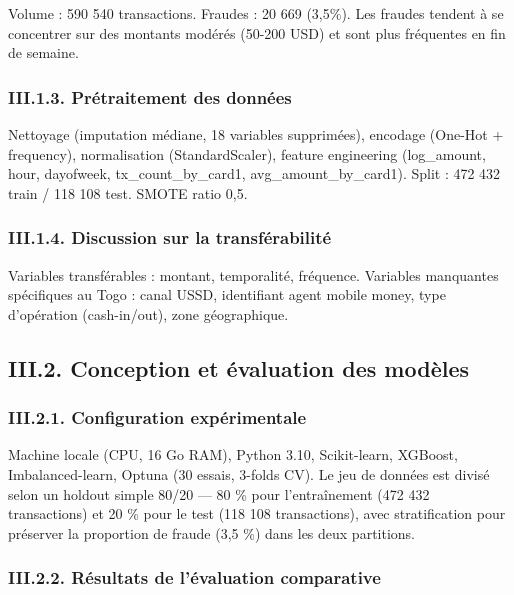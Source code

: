\documentclass[
  12pt,
]{article}
\begin{document}
Volume : 590 540 transactions. Fraudes : 20 669 (3,5\%). Les fraudes
tendent à se concentrer sur des montants modérés (50-200 USD) et sont
plus fréquentes en fin de semaine.

\subsubsection{III.1.3. Prétraitement des
données}\label{iii.1.3.-pruxe9traitement-des-donnuxe9es}

Nettoyage (imputation médiane, 18 variables supprimées), encodage
(One-Hot + frequency), normalisation (StandardScaler), feature
engineering (log\_amount, hour, dayofweek, tx\_count\_by\_card1,
avg\_amount\_by\_card1). Split : 472 432 train / 118 108 test. SMOTE
ratio 0,5.

\subsubsection{III.1.4. Discussion sur la
transférabilité}\label{iii.1.4.-discussion-sur-la-transfuxe9rabilituxe9}

Variables transférables : montant, temporalité, fréquence. Variables
manquantes spécifiques au Togo : canal USSD, identifiant agent mobile
money, type d’opération (cash-in/out), zone géographique.

\subsection{III.2. Conception et évaluation des
modèles}\label{iii.2.-conception-et-uxe9valuation-des-moduxe8les}

\subsubsection{III.2.1. Configuration
expérimentale}\label{iii.2.1.-configuration-expuxe9rimentale}

Machine locale (CPU, 16 Go RAM), Python 3.10, Scikit-learn, XGBoost,
Imbalanced-learn, Optuna (30 essais, 3-folds CV). Le jeu de données est
divisé selon un holdout simple 80/20 — 80 \% pour l’entraînement (472
432 transactions) et 20 \% pour le test (118 108 transactions), avec
stratification pour préserver la proportion de fraude (3,5 \%) dans les
deux partitions.

\subsubsection{III.2.2. Résultats de l’évaluation
comparative}\label{iii.2.2.-ruxe9sultats-de-luxe9valuation-comparative}
\end{document}
